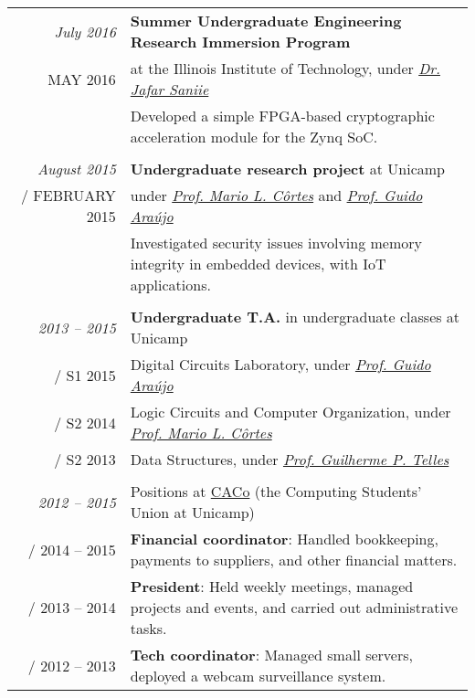 \documentclass[a4paper,10pt]{article}
\makeatletter
\def\fakesc#1{%
  \begingroup%
  \xdef\fake@name{\csname\curr@fontshape/\f@size\endcsname}%
  \fontsize{\fontdimen8\fake@name}{\baselineskip}\selectfont%
  \uppercase{#1}%
  \endgroup%
}
\renewcommand{\textsc}{\fakesc}
\makeatother
\begin{document}
\begin{tabular}{r|p{11cm}}

  \emph{July 2016} & \textbf{Summer Undergraduate Engineering Research Immersion Program} \\
  \textsc{May 2016}    &at the Illinois Institute of Technology, under \href{https://engineering.iit.edu/faculty/jafar-saniie}{\emph{Dr. Jafar Saniie}}\\
                     & \footnotesize {Developed a simple FPGA-based cryptographic acceleration module for the Zynq SoC.}\\
  \multicolumn{2}{c}{} \\


  \emph{August 2015} & \textbf{Undergraduate research project} at Unicamp\\
  \textsc{February 2015} & under \href{http://www.ic.unicamp.br/~cortes/}{\emph{Prof. Mario L. Côrtes}} and \href{http://guidoaraujo.wordpress.com/}{\emph{Prof. Guido Araújo}}\\
                     & \footnotesize {Investigated security issues involving memory integrity in embedded devices, with IoT applications.}\\
  \multicolumn{2}{c}{} \\

  \emph{2013 -- 2015} & \textbf{Undergraduate T.A.} in undergraduate classes at Unicamp \\
  \textsc{S1 2015} & \footnotesize{Digital Circuits Laboratory, under \href{http://guidoaraujo.wordpress.com/}{\emph{Prof. Guido Araújo}}}\\
  \textsc{S2 2014} & \footnotesize{Logic Circuits and Computer Organization, under \href{http://www.ic.unicamp.br/~cortes/}{\emph{Prof. Mario L. Côrtes}}}\\
  \textsc{S2 2013} & \footnotesize{Data Structures, under \href{http://ic.unicamp.br/~gpt/}{\emph{Prof. Guilherme P. Telles}}}\\
  \multicolumn{2}{c}{}\\

  \emph{2012 -- 2015} & Positions at \href{http://www.caco.ic.unicamp.br}{CACo} \footnotesize{(the Computing Students' Union at Unicamp)} \\
  \textsc{2014 -- 2015} & \footnotesize{\textbf{Financial coordinator}: Handled bookkeeping, payments to suppliers, and other financial matters.}\\
  \textsc{2013 -- 2014} & \footnotesize{\textbf{President}: Held weekly meetings, managed projects and events, and carried out administrative tasks.}\\
  \textsc{2012 -- 2013} & \footnotesize{\textbf{Tech coordinator}: Managed small servers, deployed a webcam surveillance system.}\\

\end{tabular}
\end{document}
